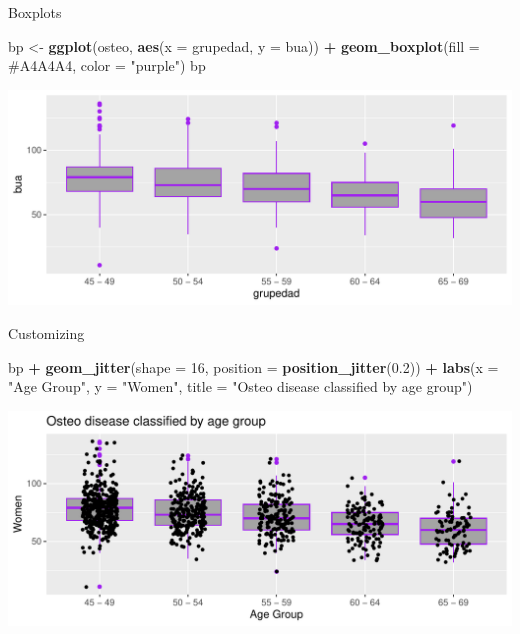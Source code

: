 \documentclass[
  ignorenonframetext,
]{beamer}
\newenvironment{Shaded}{\begin{snugshade}}{\end{snugshade}}
\newcommand{\AttributeTok}[1]{\textcolor[rgb]{0.13,0.29,0.53}{#1}}
\newcommand{\DecValTok}[1]{\textcolor[rgb]{0.00,0.00,0.81}{#1}}
\newcommand{\FloatTok}[1]{\textcolor[rgb]{0.00,0.00,0.81}{#1}}
\newcommand{\FunctionTok}[1]{\textcolor[rgb]{0.13,0.29,0.53}{\textbf{#1}}}
\newcommand{\NormalTok}[1]{#1}
\newcommand{\OtherTok}[1]{\textcolor[rgb]{0.56,0.35,0.01}{#1}}
\newcommand{\SpecialCharTok}[1]{\textcolor[rgb]{0.81,0.36,0.00}{\textbf{#1}}}
\newcommand{\StringTok}[1]{\textcolor[rgb]{0.31,0.60,0.02}{#1}}
\begin{document}
\begin{frame}[fragile]{Boxplots}
\label{boxplots}
\begin{Shaded}
\begin{Highlighting}[]
\NormalTok{bp }\OtherTok{\textless{}{-}} \FunctionTok{ggplot}\NormalTok{(osteo, }\FunctionTok{aes}\NormalTok{(}\AttributeTok{x =}\NormalTok{ grupedad, }\AttributeTok{y =}\NormalTok{ bua)) }\SpecialCharTok{+} 
  \FunctionTok{geom\_boxplot}\NormalTok{(}\AttributeTok{fill =} \StringTok{\textquotesingle{}\#A4A4A4\textquotesingle{}}\NormalTok{, }\AttributeTok{color =} \StringTok{"purple"}\NormalTok{)}
\NormalTok{bp}
\end{Highlighting}
\end{Shaded}

\includegraphics{StatisticsWithR-3-Exploratory_Analysis_II_And_Graphics_files/figure-beamer/unnamed-chunk-12-1.pdf}
\end{frame}

\begin{frame}[fragile]{Customizing}
\label{customizing-1}
\begin{Shaded}
\begin{Highlighting}[]
\NormalTok{bp }\SpecialCharTok{+} \FunctionTok{geom\_jitter}\NormalTok{(}\AttributeTok{shape =} \DecValTok{16}\NormalTok{, }\AttributeTok{position =} \FunctionTok{position\_jitter}\NormalTok{(}\FloatTok{0.2}\NormalTok{)) }\SpecialCharTok{+}
  \FunctionTok{labs}\NormalTok{(}\AttributeTok{x =} \StringTok{"Age Group"}\NormalTok{, }\AttributeTok{y =} \StringTok{"Women"}\NormalTok{, }\AttributeTok{title =} \StringTok{"Osteo disease classified by age group"}\NormalTok{)}
\end{Highlighting}
\end{Shaded}

\includegraphics{StatisticsWithR-3-Exploratory_Analysis_II_And_Graphics_files/figure-beamer/unnamed-chunk-13-1.pdf}
\end{frame}
\end{document}
